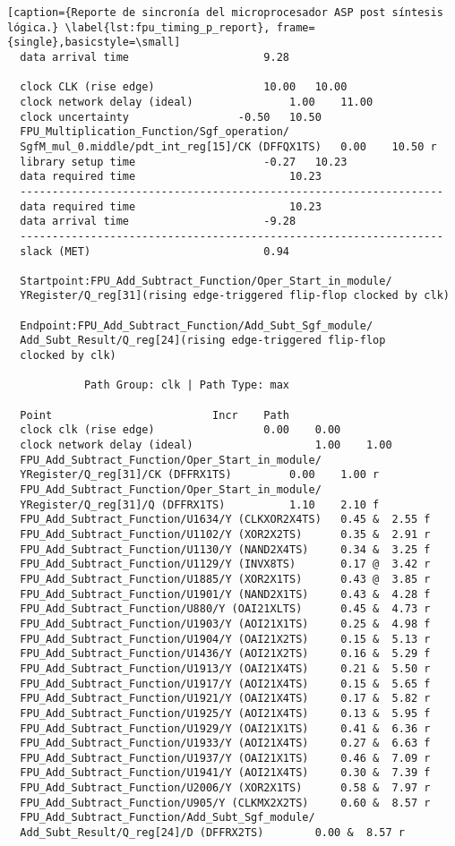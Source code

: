 \begin{lstlisting}[caption={Reporte de sincronía del microprocesador ASP post síntesis lógica.} \label{lst:fpu_timing_p_report}, frame={single},basicstyle=\small]
  data arrival time						9.28

  clock CLK (rise edge)					10.00	10.00
  clock network delay (ideal)				1.00	11.00
  clock uncertainty					-0.50	10.50
  FPU_Multiplication_Function/Sgf_operation/
  SgfM_mul_0.middle/pdt_int_reg[15]/CK (DFFQX1TS)	0.00	10.50 r
  library setup time					-0.27	10.23
  data required time						10.23
  ------------------------------------------------------------------
  data required time						10.23
  data arrival time						-9.28
  ------------------------------------------------------------------
  slack (MET)							0.94
  
  Startpoint:FPU_Add_Subtract_Function/Oper_Start_in_module/
  YRegister/Q_reg[31](rising edge-triggered flip-flop clocked by clk)
  
  Endpoint:FPU_Add_Subtract_Function/Add_Subt_Sgf_module/
  Add_Subt_Result/Q_reg[24](rising edge-triggered flip-flop
  clocked by clk)
  
  			Path Group: clk | Path Type: max

  Point							Incr	Path
  clock clk (rise edge)					0.00	0.00
  clock network delay (ideal)           		1.00	1.00
  FPU_Add_Subtract_Function/Oper_Start_in_module/
  YRegister/Q_reg[31]/CK (DFFRX1TS)			0.00	1.00 r
  FPU_Add_Subtract_Function/Oper_Start_in_module/
  YRegister/Q_reg[31]/Q (DFFRX1TS)			1.10	2.10 f
  FPU_Add_Subtract_Function/U1634/Y (CLKXOR2X4TS)	0.45 &	2.55 f
  FPU_Add_Subtract_Function/U1102/Y (XOR2X2TS)		0.35 &	2.91 r
  FPU_Add_Subtract_Function/U1130/Y (NAND2X4TS)		0.34 &	3.25 f
  FPU_Add_Subtract_Function/U1129/Y (INVX8TS)		0.17 @  3.42 r
  FPU_Add_Subtract_Function/U1885/Y (XOR2X1TS)		0.43 @	3.85 r
  FPU_Add_Subtract_Function/U1901/Y (NAND2X1TS)		0.43 &	4.28 f
  FPU_Add_Subtract_Function/U880/Y (OAI21XLTS)		0.45 &	4.73 r
  FPU_Add_Subtract_Function/U1903/Y (AOI21X1TS)		0.25 &	4.98 f
  FPU_Add_Subtract_Function/U1904/Y (OAI21X2TS)		0.15 &	5.13 r
  FPU_Add_Subtract_Function/U1436/Y (AOI21X2TS)		0.16 &	5.29 f
  FPU_Add_Subtract_Function/U1913/Y (OAI21X4TS)		0.21 &	5.50 r
  FPU_Add_Subtract_Function/U1917/Y (AOI21X4TS)		0.15 &	5.65 f
  FPU_Add_Subtract_Function/U1921/Y (OAI21X4TS)		0.17 &	5.82 r
  FPU_Add_Subtract_Function/U1925/Y (AOI21X4TS)		0.13 &	5.95 f
  FPU_Add_Subtract_Function/U1929/Y (OAI21X1TS)		0.41 &	6.36 r
  FPU_Add_Subtract_Function/U1933/Y (AOI21X4TS)		0.27 &	6.63 f
  FPU_Add_Subtract_Function/U1937/Y (OAI21X1TS)		0.46 &	7.09 r
  FPU_Add_Subtract_Function/U1941/Y (AOI21X4TS)		0.30 &	7.39 f
  FPU_Add_Subtract_Function/U2006/Y (XOR2X1TS)		0.58 &	7.97 r
  FPU_Add_Subtract_Function/U905/Y (CLKMX2X2TS)		0.60 &	8.57 r
  FPU_Add_Subtract_Function/Add_Subt_Sgf_module/
  Add_Subt_Result/Q_reg[24]/D (DFFRX2TS)		0.00 &	8.57 r
  

\end{lstlisting}
